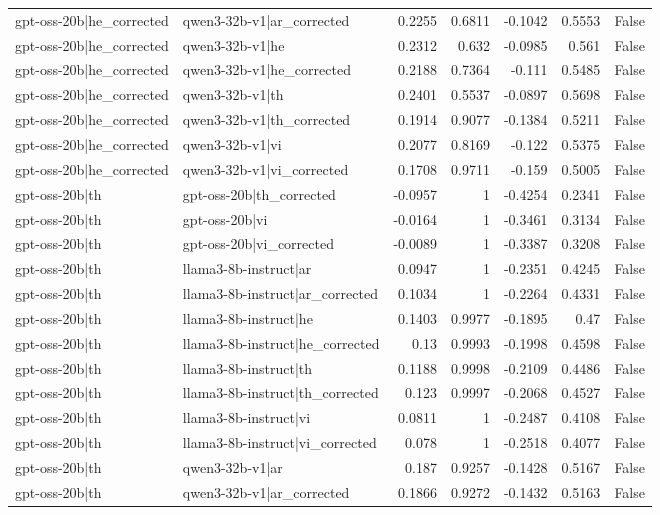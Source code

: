 \begin{table}
\begin{tabular}{l l r r r r l}
gpt-oss-20b|he_corrected & qwen3-32b-v1|ar_corrected & 0.2255 & 0.6811 & -0.1042 & 0.5553 & False \\
gpt-oss-20b|he_corrected & qwen3-32b-v1|he & 0.2312 & 0.632 & -0.0985 & 0.561 & False \\
gpt-oss-20b|he_corrected & qwen3-32b-v1|he_corrected & 0.2188 & 0.7364 & -0.111 & 0.5485 & False \\
gpt-oss-20b|he_corrected & qwen3-32b-v1|th & 0.2401 & 0.5537 & -0.0897 & 0.5698 & False \\
gpt-oss-20b|he_corrected & qwen3-32b-v1|th_corrected & 0.1914 & 0.9077 & -0.1384 & 0.5211 & False \\
gpt-oss-20b|he_corrected & qwen3-32b-v1|vi & 0.2077 & 0.8169 & -0.122 & 0.5375 & False \\
gpt-oss-20b|he_corrected & qwen3-32b-v1|vi_corrected & 0.1708 & 0.9711 & -0.159 & 0.5005 & False \\
gpt-oss-20b|th & gpt-oss-20b|th_corrected & -0.0957 & 1 & -0.4254 & 0.2341 & False \\
gpt-oss-20b|th & gpt-oss-20b|vi & -0.0164 & 1 & -0.3461 & 0.3134 & False \\
gpt-oss-20b|th & gpt-oss-20b|vi_corrected & -0.0089 & 1 & -0.3387 & 0.3208 & False \\
gpt-oss-20b|th & llama3-8b-instruct|ar & 0.0947 & 1 & -0.2351 & 0.4245 & False \\
gpt-oss-20b|th & llama3-8b-instruct|ar_corrected & 0.1034 & 1 & -0.2264 & 0.4331 & False \\
gpt-oss-20b|th & llama3-8b-instruct|he & 0.1403 & 0.9977 & -0.1895 & 0.47 & False \\
gpt-oss-20b|th & llama3-8b-instruct|he_corrected & 0.13 & 0.9993 & -0.1998 & 0.4598 & False \\
gpt-oss-20b|th & llama3-8b-instruct|th & 0.1188 & 0.9998 & -0.2109 & 0.4486 & False \\
gpt-oss-20b|th & llama3-8b-instruct|th_corrected & 0.123 & 0.9997 & -0.2068 & 0.4527 & False \\
gpt-oss-20b|th & llama3-8b-instruct|vi & 0.0811 & 1 & -0.2487 & 0.4108 & False \\
gpt-oss-20b|th & llama3-8b-instruct|vi_corrected & 0.078 & 1 & -0.2518 & 0.4077 & False \\
gpt-oss-20b|th & qwen3-32b-v1|ar & 0.187 & 0.9257 & -0.1428 & 0.5167 & False \\
gpt-oss-20b|th & qwen3-32b-v1|ar_corrected & 0.1866 & 0.9272 & -0.1432 & 0.5163 & False \\

\end{tabular}
\end{table}
